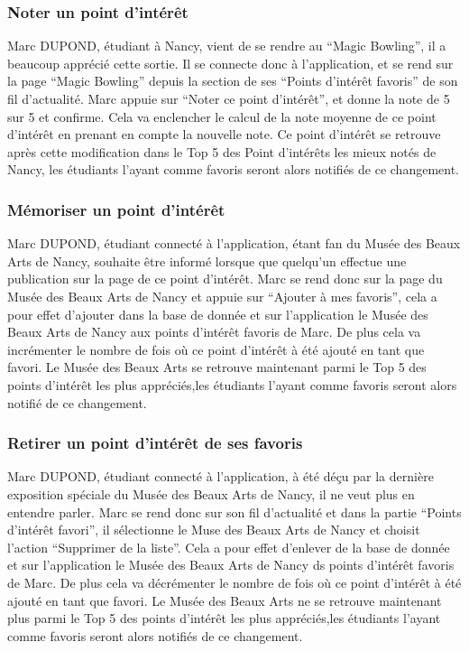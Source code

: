 \subsubsection*{Noter un point d’intérêt}
Marc DUPOND, étudiant à Nancy, vient de se rendre au “Magic Bowling”, il a beaucoup apprécié cette sortie. Il se connecte donc à l'application, et se rend sur la page “Magic Bowling” depuis la section de ses “Points d’intérêt favoris” de son fil d’actualité.
Marc appuie sur “Noter ce point d’intérêt”, et donne la note de 5 sur 5  et confirme. Cela va enclencher  le calcul de la note moyenne de ce point d'intérêt en prenant en compte la nouvelle note. Ce point d’intérêt se retrouve après cette modification dans le Top 5 des Point d’intérêts les mieux notés de Nancy, les étudiants l’ayant comme favoris seront alors notifiés de ce changement.


\subsubsection*{Mémoriser un point d’intérêt}
Marc DUPOND, étudiant connecté à l'application, étant fan du Musée des Beaux Arts de Nancy, souhaite être informé lorsque que quelqu'un effectue une publication sur la page de ce point d’intérêt. Marc se rend donc sur la page du Musée des Beaux Arts de Nancy et appuie sur “Ajouter à mes favoris”, cela a pour effet d’ajouter dans la base de donnée et sur l'application le Musée des Beaux Arts de Nancy aux points d’intérêt favoris de Marc.
De plus cela va incrémenter le nombre de fois où ce point d’intérêt à été ajouté en tant que favori. Le Musée des Beaux Arts se retrouve maintenant parmi le Top 5 des points d’intérêt les plus appréciés,les étudiants l’ayant comme favoris seront alors notifié de ce changement.

\subsubsection*{Retirer un point d’intérêt de ses favoris}
Marc DUPOND, étudiant connecté à l'application, à été déçu par la dernière exposition spéciale du Musée des Beaux Arts de Nancy, il ne veut plus en entendre parler. Marc se rend donc sur son fil d’actualité et dans la partie “Points d’intérêt favori”, il sélectionne le Muse des Beaux Arts de Nancy et choisit l’action “Supprimer de la liste”. Cela a pour effet d’enlever de la base de donnée et sur l'application le Musée des Beaux Arts de Nancy ds points d’intérêt favoris de Marc.
De plus cela va décrémenter le nombre de fois où ce point d’intérêt à été ajouté en tant que favori. Le Musée des Beaux Arts ne se retrouve maintenant plus parmi le Top 5 des points d’intérêt les plus appréciés,les étudiants l’ayant comme favoris seront alors notifiés de ce changement.


